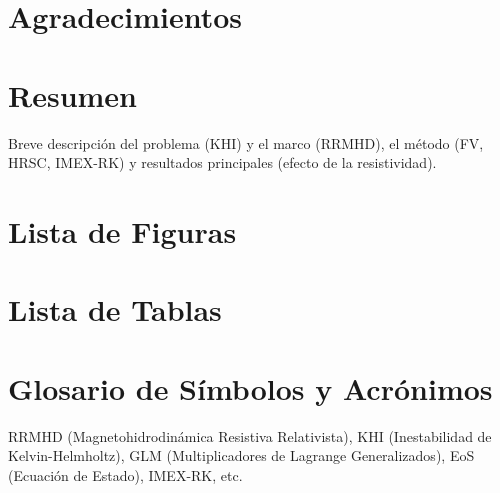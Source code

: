 \chapter*{Agradecimientos}
\chapter*{Resumen}
    Breve descripción del problema (KHI) y el marco (RRMHD), el método (FV, HRSC, IMEX-RK) y resultados principales (efecto de la resistividad).
\chapter*{Lista de Figuras}
\chapter*{Lista de Tablas}
\chapter*{Glosario de Símbolos y Acrónimos}
    RRMHD (Magnetohidrodinámica Resistiva Relativista), KHI (Inestabilidad de Kelvin-Helmholtz), GLM (Multiplicadores de Lagrange Generalizados), EoS (Ecuación de Estado), IMEX-RK, etc.
